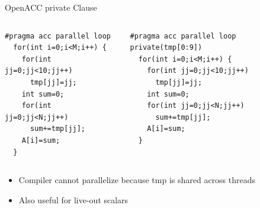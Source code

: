 \documentclass[10pt,t]{beamer}
\begin{document}
\begin{frame}[fragile]{OpenACC private Clause}
  \begin{columns}
    \begin{block}{}
      \begin{lstlisting}[basicstyle=\small\ttfamily,language=OmpC]
#pragma acc parallel loop
  for(int i=0;i<M;i++) {
    for(int jj=0;jj<10;jj++)
      tmp[jj]=jj;
    int sum=0;
    for(int jj=0;jj<N;jj++)
      sum+=tmp[jj];
    A[i]=sum;
  }
      \end{lstlisting}
    \end{block}
    \begin{block}{}
      \begin{lstlisting}[basicstyle=\small\ttfamily,language=OmpC]
#pragma acc parallel loop private(tmp[0:9])
  for(int i=0;i<M;i++) {
    for(int jj=0;jj<10;jj++)
      tmp[jj]=jj;
    int sum=0;
    for(int jj=0;jj<N;jj++)
      sum+=tmp[jj];
    A[i]=sum;
  }
      \end{lstlisting}
    \end{block}
  \end{columns}
  \begin{itemize}
    \item Compiler cannot parallelize because tmp is shared across threads
    \item Also useful for live-out scalars
  \end{itemize}
\end{frame}
\end{document}
